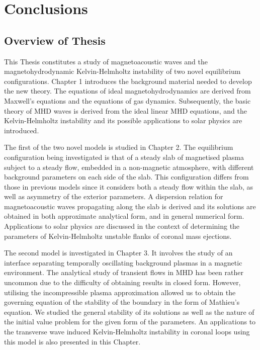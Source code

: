 \documentclass[12pt]{ociamthesis}
\begin{document}
\baselineskip=18pt


\chapter{Conclusions}

\section{Overview of Thesis}

This Thesis constitutes a study of magnetoacoustic waves and the magnetohydrodynamic Kelvin-Helmholtz instability of two novel equilibrium configurations.
Chapter 1 introduces the background material needed to develop the new theory.
The equations of ideal magnetohydrodynamics are derived from Maxwell's equations and the equations of gas dynamics.
Subsequently, the basic theory of MHD waves is derived from the ideal linear MHD equations, and the Kelvin-Helmholtz instability and its possible applications to solar physics are introduced.

The first of the two novel models is studied in Chapter 2.
The equilibrium configuration being investigated is that of a steady slab of magnetised plasma subject to a steady flow, embedded in a non-magnetic atmosphere, with different background parameters on each side of the slab.
This configuration differs from those in previous models since it considers both a steady flow within the slab, as well as asymmetry of the exterior parameters.
A dispersion relation for magnetoacoustic waves propagating along the slab is derived and its solutions are obtained in both approximate analytical form, and in general numerical form.
Applications to solar physics are discussed in the context of determining the parameters of Kelvin-Helmholtz unstable flanks of coronal mass ejections.

The second model is investigated in Chapter 3.
It involves the study of an interface separating temporally oscillating background plasmas in a magnetic environment.
The analytical study of transient flows in MHD has been rather uncommon due to the difficulty of obtaining results in closed form.
However, utilising the incompressible plasma approximation allowed us to obtain the governing equation of the stability of the boundary in the form of Mathieu's equation.
We studied the general stability of its solutions as well as the nature of the initial value problem for the given form of the parameters.
An applications to the transverse wave induced Kelvin-Helmholtz instability in coronal loops using this model is also presented in this Chapter.
\end{document}
